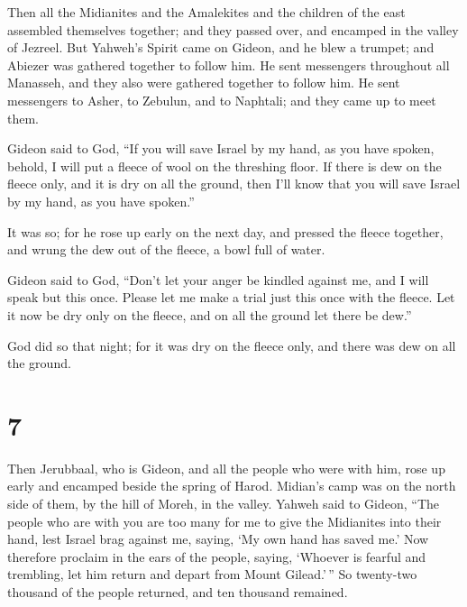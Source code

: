  Then all the Midianites and the Amalekites and the
children of the east assembled themselves together; and they passed
over, and encamped in the valley of Jezreel.  But Yahweh's
Spirit came on Gideon, and he blew a trumpet; and Abiezer was gathered
together to follow him.  He sent messengers throughout all
Manasseh, and they also were gathered together to follow him. He sent
messengers to Asher, to Zebulun, and to Naphtali; and they came up to
meet them.

 Gideon said to God, ``If you will save Israel by my hand,
as you have spoken,  behold, I will put a fleece of wool on
the threshing floor. If there is dew on the fleece only, and it is dry
on all the ground, then I'll know that you will save Israel by my hand,
as you have spoken.''

 It was so; for he rose up early on the next day, and
pressed the fleece together, and wrung the dew out of the fleece, a bowl
full of water.

 Gideon said to God, ``Don't let your anger be kindled
against me, and I will speak but this once. Please let me make a trial
just this once with the fleece. Let it now be dry only on the fleece,
and on all the ground let there be dew.''

 God did so that night; for it was dry on the fleece only,
and there was dew on all the ground.

\hypertarget{section-6}{%
\section{7}\label{section-6}}

 Then Jerubbaal, who is Gideon, and all the people who were
with him, rose up early and encamped beside the spring of Harod.
Midian's camp was on the north side of them, by the hill of Moreh, in
the valley.  Yahweh said to Gideon, ``The people who are
with you are too many for me to give the Midianites into their hand,
lest Israel brag against me, saying, `My own hand has saved me.'
 Now therefore proclaim in the ears of the people, saying,
`Whoever is fearful and trembling, let him return and depart from Mount
Gilead.'\,'' So twenty-two thousand of the people returned, and ten
thousand remained.

